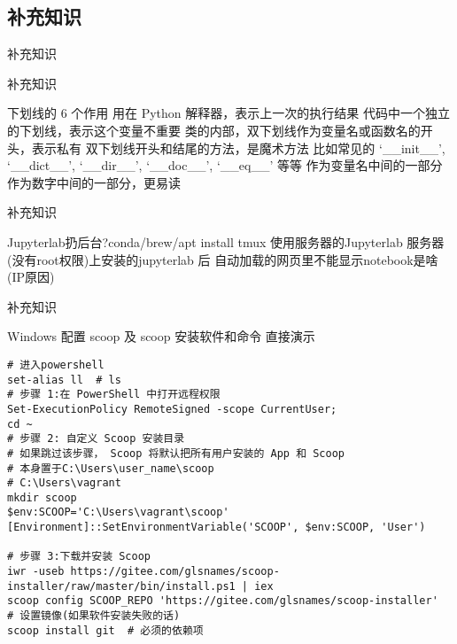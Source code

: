 \subsection{补充知识}
\begin{frame}[standout] 补充知识 \end{frame}
\begin{frame}{补充知识}
    \begin{myoutline}
        \1 下划线的 6 个作用
            \2 用在 Python 解释器，表示上一次的执行结果
            \2 代码中一个独立的下划线，表示这个变量不重要
            \2 类的内部，双下划线作为变量名或函数名的开头，表示私有
            \2 双下划线开头和结尾的方法，是魔术方法
                \3 比如常见的 `\_\_init\_\_', `\_\_dict\_\_', `\_\_dir\_\_', `\_\_doc\_\_', `\_\_eq\_\_' 等等
            \2 作为变量名中间的一部分
            \2 作为数字中间的一部分，更易读
    \end{myoutline}
\end{frame}
\begin{frame}{补充知识}
    \begin{myoutline}
        \1 Jupyterlab扔后台?conda/brew/apt install tmux
        \1 使用服务器的Jupyterlab
        \1 服务器(没有root权限)上安装的jupyterlab 后 自动加载的网页里不能显示notebook是啥(IP原因)
    \end{myoutline}
\end{frame}
\begin{frame}[fragile]{补充知识}
    \begin{myoutline}
        \1 Windows 配置 scoop 及 scoop 安装软件和命令
            \2 直接演示
    \end{myoutline}
    \begin{lstlisting}
# 进入powershell
set-alias ll  # ls
# 步骤 1:在 PowerShell 中打开远程权限
Set-ExecutionPolicy RemoteSigned -scope CurrentUser;
cd ~
# 步骤 2: 自定义 Scoop 安装目录
# 如果跳过该步骤， Scoop 将默认把所有用户安装的 App 和 Scoop 
# 本身置于C:\Users\user_name\scoop
# C:\Users\vagrant
mkdir scoop
$env:SCOOP='C:\Users\vagrant\scoop'
[Environment]::SetEnvironmentVariable('SCOOP', $env:SCOOP, 'User')

# 步骤 3:下载并安装 Scoop
iwr -useb https://gitee.com/glsnames/scoop-installer/raw/master/bin/install.ps1 | iex
scoop config SCOOP_REPO 'https://gitee.com/glsnames/scoop-installer'  # 设置镜像(如果软件安装失败的话)
scoop install git  # 必须的依赖项
    \end{lstlisting}

\end{frame}
